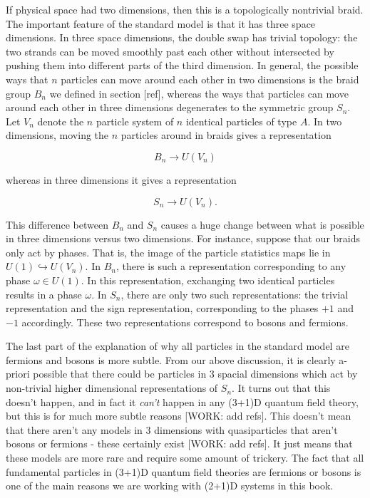 \documentclass{article}
\theoremstyle{definition}
\numberwithin{figure}{section}
\begin{document}
If physical space had two dimensions, then this is a topologically nontrivial braid. The important feature of the standard model is that it has three space dimensions. In three space dimensions, the double swap has trivial topology: the two strands can be moved smoothly past each other without intersected by pushing them into different parts of the third dimension. In general, the possible ways that $n$ particles can move around each other in two dimensions is the braid group $B_n$ we defined in section [ref], whereas the ways that particles can move around each other in three dimensions degenerates to the symmetric group $S_n$. Let $V_n$ denote the $n$ particle system of $n$ identical particles of type $A$. In two dimensions, moving the $n$ particles around in braids gives a representation

$$B_n\xrightarrow{}U(V_n)$$

whereas in three dimensions it gives a representation

$$S_n\xrightarrow{}U(V_n).$$

This difference between $B_n$ and $S_n$ causes a huge change between what is possible in three dimensions versus two dimensions. For instance, suppose that our braids only act by phases. That is, the image of the particle statistics maps lie in $U(1)\hookrightarrow{}U(V_n)$. In $B_n$, there is such a representation corresponding to any phase $\omega\in U(1)$. In this representation, exchanging two identical particles results in a phase $\omega$. In $S_n$, there are only two such representations: the trivial representation and the sign representation, corresponding to the phases $+1$ and $-1$ accordingly. These two representations correspond to bosons and fermions.

The last part of the explanation of why all particles in the standard model are fermions and bosons is more subtle. From our above discussion, it is clearly a-priori possible that there could be particles in 3 spacial dimensions which act by non-trivial higher dimensional representations of $S_n$. It turns out that this doesn't happen, and in fact it \textit{can't} happen in any (3+1)D quantum field theory, but this is for much more subtle reasons [WORK: add refs]. This doesn't mean that there aren't any models in 3 dimensions with quasiparticles that aren't bosons or fermions - these certainly exist [WORK: add refs]. It just means that these models are more rare and require some amount of trickery. The fact that all fundamental particles in (3+1)D quantum field theories are fermions or bosons is one of the main reasons we are working with (2+1)D systems in this book.
\end{document}
